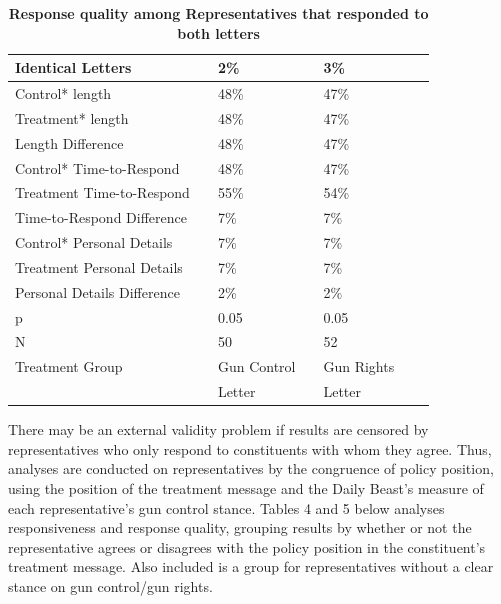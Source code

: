 \documentclass[12pt]{article}\usepackage[]{graphicx}\usepackage[]{color}
\begin{document}
 \begin{table}[h!]
	\caption{\textbf{Response quality among Representatives that responded to both letters}}
	\label{tab2}
	\begin{tabular}{lllllll}
		\textbf{Identical Letters}   && \textbf{2\%}           &&   \textbf{3\%} \\
		\hline
	    Control* length   && 48\%            &&   47\%\\
	    Treatment* length   && 48\%            &&   47\%\\
	    Length Difference   && 48\%            &&   47\%\\
	    \hline
	    Control* Time-to-Respond   && 48\%            &&   47\%\\
	    Treatment Time-to-Respond && 55\%          &&   54\%\\ 
	    Time-to-Respond Difference && 7\%            &&   7\%\\ 
	    \hline
	    Control* Personal Details                && 7\%            &&   7\%\\
	    Treatment Personal Details                && 7\%            &&   7\%\\
	    Personal Details Difference && 2\%                      && 2\%\\
	    \hline
	    p            && 0.05 				&&   0.05 \\
	    N 			 &&      50 			 &&  52    \\
	    \hline
	    Treatment Group && Gun Control  && Gun Rights & \\
	    &&	Letter		&& Letter
	\end{tabular}
\end{table}

There may be an external validity problem if results are censored by representatives who only respond to constituents with whom they agree. Thus, analyses are conducted on representatives by the congruence of policy position, using the position of the treatment message and the Daily Beast's measure of each representative's gun control stance. Tables 4 and 5 below analyses responsiveness and response quality, grouping results by whether or not the representative agrees or disagrees with the policy position in the constituent's treatment message. Also included is a group for representatives without a clear stance on gun control/gun rights.
\end{document}
